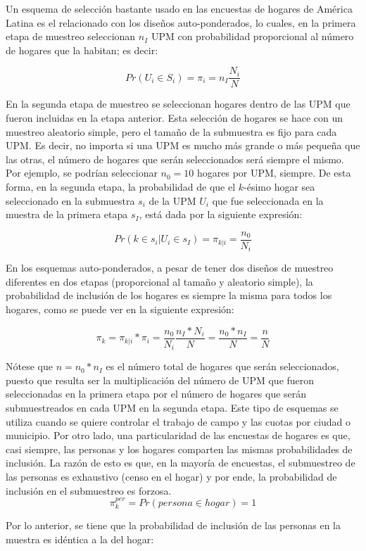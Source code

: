 Un esquema de selección bastante usado en las encuestas de hogares de América Latina es el relacionado con los diseños auto-ponderados, lo cuales, en la primera etapa de muestreo seleccionan \(n_I\) UPM con probabilidad proporcional al número de hogares que la habitan; es decir:

\[Pr(U_i \in S_i) = \pi_i = n_I \frac{N_i}{N}\]

En la segunda etapa de muestreo se seleccionan hogares dentro de las UPM que fueron incluidas en la etapa anterior. Esta selección de hogares se hace con un muestreo aleatorio simple, pero el tamaño de la submuestra es fijo para cada UPM. Es decir, no importa si una UPM es mucho más grande o más pequeña que las otras, el número de hogares que serán seleccionados será siempre el mismo. Por ejemplo, se podrían seleccionar \(n_0 = 10\) hogares por UPM, siempre. De esta forma, en la segunda etapa, la probabilidad de que el \(k\)-ésimo hogar sea seleccionado en la submuestra \(s_i\) de la UPM \(U_i\) que fue seleccionada en la muestra de la primera etapa \(s_I\), está dada por la siguiente expresión:

\[Pr(k \in s_i | U_i \in s_I ) = \pi_{k|i} = \frac{n_0}{N_i}\]

En los esquemas auto-ponderados, a pesar de tener dos diseños de muestreo diferentes en dos etapas (proporcional al tamaño y aleatorio simple), la probabilidad de inclusión de los hogares es siempre la misma para todos los hogares, como se puede ver en la siguiente expresión:

\[\pi_k = \pi_{k|i} * \pi_i = \frac{n_0}{N_i} \frac{n_I* N_i}{N} = \frac{n_0*n_I}{N} = \frac{n}{N}\]

Nótese que \(n = n_0 * n_I\) es el número total de hogares que serán seleccionados, puesto que resulta ser la multiplicación del número de UPM que fueron seleccionadas en la primera etapa por el número de hogares que serán submuestreados en cada UPM en la segunda etapa. Este tipo de esquemas se utiliza cuando se quiere controlar el trabajo de campo y las cuotas por ciudad o municipio. Por otro lado, una particularidad de las encuestas de hogares es que, casi siempre, las personas y los hogares comparten las mismas probabilidades de inclusión. La razón de esto es que, en la mayoría de encuestas, el submuestreo de las personas es exhaustivo (censo en el hogar) y por ende, la probabilidad de inclusión en el submuestreo es forzosa.
\[\pi_k^{per} = Pr(persona \in hogar) =  1\]

Por lo anterior, se tiene que la probabilidad de inclusión de las personas en la muestra es idéntica a la del hogar:

